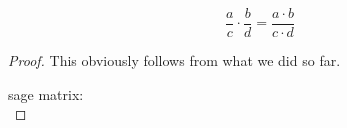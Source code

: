 %




\begin{theorem}
    \leanok

$$
\frac{a}{c} \cdot \frac{b}{d} = \frac{a \cdot b}{c \cdot d}
$$

\end{theorem}
    

\begin{proof}
\leanok
This obviously follows from what we did so far.


sage matrix:
$$
$$
\end{proof}